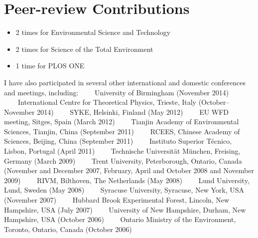 
\section*{Peer-review Contributions}
\begin{itemize}
  \itemsep-0.1em
\item 2 times for Environmental Science and Technology 
\item 2 times for Science of the Total Environment 
\item 1 time for PLOS ONE 
\end{itemize}


\flushleft I have also participated in several other international and domestic
conferences and meetings, including: 
\ \ \textbullet \ \  
University of Birmingham (November 2014)
\ \ \textbullet \ \  
International Centre for Theoretical Physics, Trieste, Italy
(October--November 2014)
\ \ \textbullet \ \  
SYKE, Helsinki, Finland (May 2012)
\ \ \textbullet \ \  
EU WFD meeting, Sitges, Spain (March 2012)
\ \ \textbullet \ \   
Tianjin Academy of Environmental Sciences, Tianjin, China (September 2011)
\ \ \textbullet \ \   
RCEES, Chinese Academy of Sciences, Beijing, China (September 2011)
\ \ \textbullet \ \   
Instituto Superior Técnico, Lisbon, Portugal (April 2011)
\ \ \textbullet \ \   
Technische Universität München, Freising, Germany (March 2009) 
\ \ \textbullet \ \   
Trent University, Peterborough, Ontario, Canada (November and December
2007, February, April and October 2008 and November 2009)
\ \ \textbullet \ \   
RIVM, Bilthoven, The Netherlands (May 2008)
\ \ \textbullet \ \   
Lund University, Lund, Sweden (May 2008)
\ \ \textbullet \ \   
Syracuse University, Syracuse, New York, USA (November 2007)
\ \ \textbullet \ \   
Hubbard Brook Experimental Forest, Lincoln, New Hampshire, USA (July 2007)
\ \ \textbullet \ \   
University of New Hampshire, Durham, New Hampshire, USA (October
2006) 
\ \ \textbullet \ \   
Ontario Ministry of the Environment, Toronto, Ontario, Canada (October 2006)


